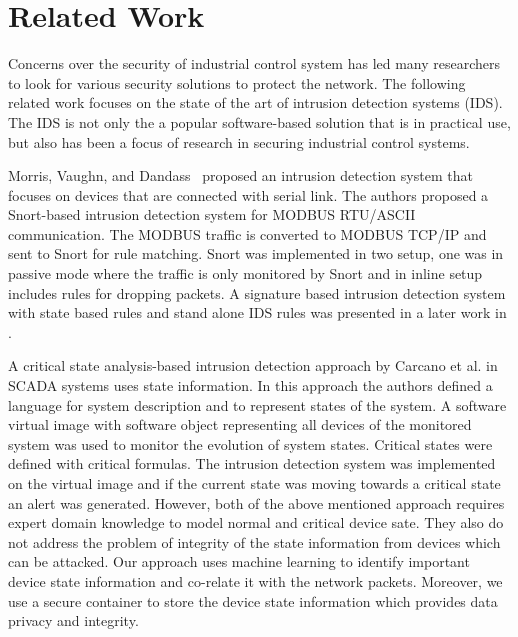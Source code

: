 \documentclass[conference]{IEEEtran}
\begin{document}
\section{Related Work}

Concerns over the security of industrial control system has led many researchers to look for various security solutions to protect the network. The following related work focuses on the state of the art of intrusion detection systems (IDS).  The IDS is not only the a popular software-based solution that is in practical use, but also has been a focus of research in securing industrial control systems.

\par Morris, Vaughn, and Dandass~\cite{c2} proposed an intrusion detection system that focuses on devices that are connected with serial link. The authors proposed a Snort-based intrusion detection system for MODBUS RTU/ASCII communication. The MODBUS traffic is converted to MODBUS TCP/IP and sent to Snort for rule matching. Snort was implemented in two setup, one was in passive mode where the traffic is only monitored by Snort and in inline setup includes rules for dropping packets. 
A signature based intrusion detection system with state based rules and stand alone IDS rules was presented in a later work in \cite{c9}.
\par A critical state analysis-based intrusion detection approach by Carcano et al. \cite{c4} in SCADA systems uses state information. In this approach the authors defined a language for system description and to represent states of the system. A software virtual image with software object representing all devices of the monitored system was used to monitor the evolution of system states. Critical states were defined with critical formulas. The intrusion detection system was implemented on the virtual image and if the current state was moving towards a critical state an alert was generated.
However, both of the above mentioned approach requires expert domain knowledge to model normal and critical device sate. They also do not address the problem of integrity of the state information from devices which can be attacked. Our approach uses machine learning to identify important device state information and co-relate it with the network packets. Moreover, we use a secure container to store the device state information which provides data privacy and integrity.
\end{document}
